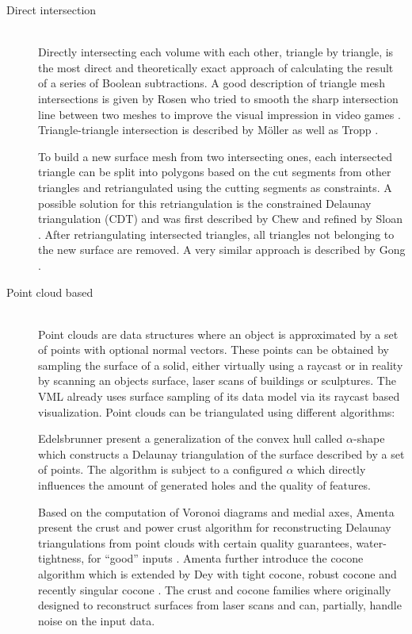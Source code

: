 \begin{description}
	\item[Direct intersection] \hfill \\
	Directly intersecting each volume with each other, triangle by triangle, is the most direct and theoretically exact approach of calculating the result of a series of Boolean subtractions.
	A good description of triangle mesh intersections is given by Rosen who tried to smooth the sharp intersection line between two meshes to improve the visual impression in video games \cite{mesh_intersection}.
	Triangle-triangle intersection is described by Möller \cite{tri_tri_intersection_moller} as well as Tropp \etal \cite{tri_tri_intersection_2}.

	To build a new surface mesh from two intersecting ones, each intersected triangle can be split into polygons based on the cut segments from other triangles and retriangulated using the cutting segments as constraints.
	A possible solution for this retriangulation is the constrained Delaunay triangulation (CDT) and was first described by Chew \cite{cdt} and refined by Sloan \cite{cdt_fast}.
	After retriangulating intersected triangles, all triangles not belonging to the new surface are removed.
	A very similar approach is described by Gong \cite{cutter_workpiece_engagement}.


	\item[Point cloud based] \hfill \\
	Point clouds are data structures where an object is approximated by a set of points with optional normal vectors.
	These points can be obtained \eg by sampling the surface of a solid, either virtually using a raycast or in reality by scanning an objects surface, \eg laser scans of buildings or sculptures.
	The VML already uses surface sampling of its data model via its raycast based visualization.
	Point clouds can be triangulated using different algorithms:

	Edelsbrunner \etal present a generalization of the convex hull called $\alpha$-shape \cite{alpha_shape} which constructs a Delaunay triangulation of the surface described by a set of points.
	The algorithm is subject to a configured $\alpha$ which directly influences the amount of generated holes and the quality of features.

	Based on the computation of Voronoi diagrams and medial axes, Amenta \etal present the crust and power crust algorithm for reconstructing Delaunay triangulations from point clouds with certain quality guarantees, \eg water-tightness, for \enquote{good} inputs \cite{crust, power_crust}.
	Amenta \etal further introduce the cocone algorithm \cite{cocone} which is extended by Dey \etal with tight cocone, robust cocone and recently singular cocone \cite{tight_cocone, robust_cocone, singular_cocone}.
	The crust and cocone families where originally designed to reconstruct surfaces from laser scans and can, partially, handle noise on the input data.


\end{description}
